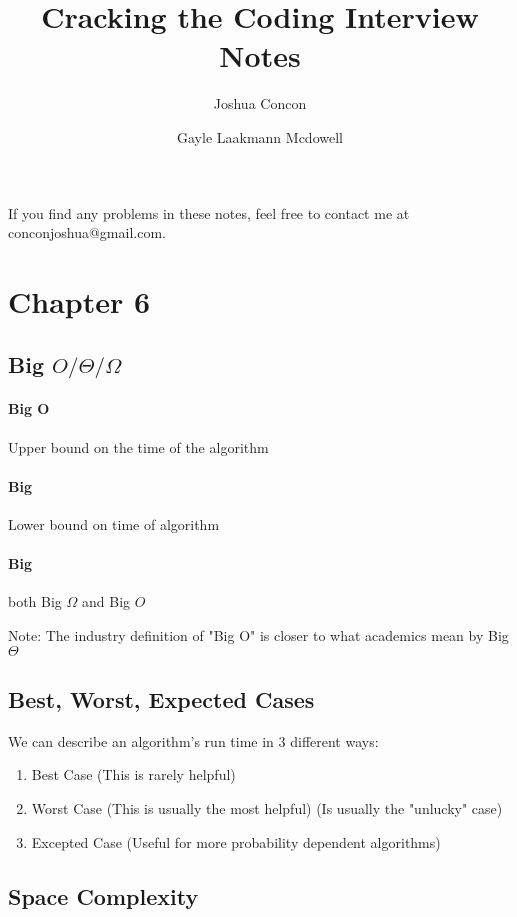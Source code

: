 \documentclass[12pt]{article}
\begin{document}
\title{Cracking the Coding Interview Notes}
\date{Gayle Laakmann Mcdowell}
\author{Joshua Concon}
\maketitle
If you find any problems in these notes, feel free to contact me at conconjoshua@gmail.com.

\tableofcontents

\pagebreak

\section{Chapter 6}

\subsection{Big $O \slash \Theta \slash \Omega$ }

\paragraph{Big O}{Upper bound on the time of the algorithm}
\paragraph{Big \Omega}{Lower bound on time of algorithm}
\paragraph{Big \Theta}{both Big $\Omega$ and Big $O$}

Note: The industry definition of "Big O" is closer to what academics mean by Big $\Theta$

\subsection{Best, Worst, Expected Cases}

We can describe an algorithm's run time in 3 different ways:
\begin{enumerate}
    \item Best Case (This is rarely helpful)
    \item Worst Case (This is usually the most helpful) (Is usually the "unlucky" case)
    \item Excepted Case (Useful for more probability dependent algorithms)
\end{enumerate}

\subsection{Space Complexity}
\end{document}
